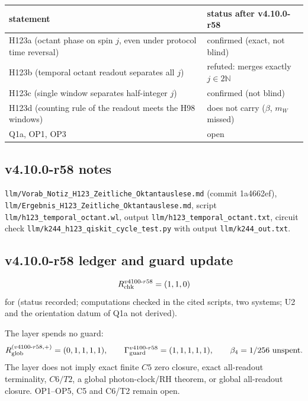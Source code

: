 \begin{center}
\small
\begin{tabular}{@{}>{\raggedright\arraybackslash}p{}>{\raggedright\arraybackslash}p{}@{}}
\toprule
statement & status after v4.10.0-r58\\
\midrule
H123a (octant phase on spin \(j\), even under protocol time reversal) & confirmed (exact, not blind)\\
H123b (temporal octant readout separates all \(j\)) & refuted: merges exactly \(j\in2\mathbb N\)\\
H123c (single window separates half-integer \(j\)) & confirmed (not blind)\\
H123d (counting rule of the readout meets the H98 windows) & does not carry (\(\beta\), \(m_W\) missed)\\
Q1a, OP1, OP3 & open\\
\bottomrule
\end{tabular}
\end{center}

\subsection*{v4.10.0-r58 notes}
\label{subsec:v4100-r58-notes}

\texttt{llm/\allowbreak Vorab\_\allowbreak Notiz\_\allowbreak H123\_\allowbreak Zeitliche\_\allowbreak Oktantauslese.md} (commit 1a4662ef),
\texttt{llm/\allowbreak Ergebnis\_\allowbreak H123\_\allowbreak Zeitliche\_\allowbreak Oktantauslese.md}, script \texttt{llm/\allowbreak h123\_\allowbreak temporal\_\allowbreak octant.wl},
output \texttt{llm/\allowbreak h123\_\allowbreak temporal\_\allowbreak octant.txt}, circuit check \texttt{llm/\allowbreak k244\_\allowbreak h123\_\allowbreak qiskit\_\allowbreak cycle\_\allowbreak test.py}
with output \texttt{llm/\allowbreak k244\_\allowbreak out.txt}.

\subsection*{v4.10.0-r58 ledger and guard update}
\label{subsec:v4100-r58-ledger-guard}

\[
R_{\rm chk}^{v4100\text{-}r58}=(1,1,0)
\]
for (status recorded; computations checked in the cited scripts, two systems; U2 and the orientation datum of Q1a not derived).

The layer spends no guard:
\[
R_{\rm glob}^{(v4100\text{-}r58,+)}=(0,1,1,1,1),
\qquad
\Gamma_{\rm guard}^{v4100\text{-}r58}=(1,1,1,1,1),
\qquad
\beta_4=1/256\ \text{unspent}.
\]
The layer does not imply exact finite \(C5\) zero closure, exact all-readout terminality, \(C6/T2\), a global photon-clock/RH theorem,
or global all-readout closure.  OP1--OP5, C5 and C6/T2 remain open.

